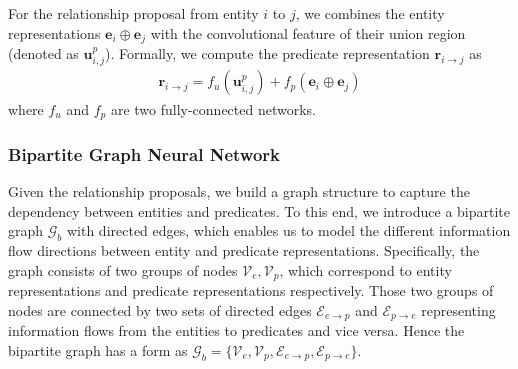 For the relationship proposal from entity $i$ to $j$, we combines the entity representations $\mathbf{e}_i\oplus\mathbf{e}_j$ with the convolutional feature of their union region (denoted as $\mathbf{u}^p_{i,j}$). Formally, we compute the predicate representation $\mathbf{r}_{i\to  j}$ as 
\begin{align}
    \mathbf{r}_{i\to  j}=f_{u}(\mathbf{u}^p_{i,j}) + f_{p}(\mathbf{e}_i\oplus\mathbf{e}_j)
\end{align}
where $f_u$ and $f_p$ are two fully-connected networks.


\subsubsection{Bipartite Graph Neural Network}
\label{subsec:bgnn}


Given the relationship proposals, we build a graph structure to capture the dependency between entities and predicates. To this end, we introduce a bipartite graph $\mathcal{G}_b$ with directed edges, which enables us to model the different information flow directions between entity and predicate representations.
Specifically, the graph consists of two groups of nodes $\mathcal{V}_e,\mathcal{V}_p$, which correspond to entity representations and predicate representations respectively. Those two groups of nodes are connected by two sets of directed edges $\mathcal{E}_{e\to  p}$ and $\mathcal{E}_{p\to  e}$ representing information flows from the entities to predicates and vice versa. Hence the bipartite graph has a form as $\mathcal{G}_b=\{\mathcal{V}_e,\mathcal{V}_p, \mathcal{E}_{e\to  p}, \mathcal{E}_{p\to  e}\}$. 

